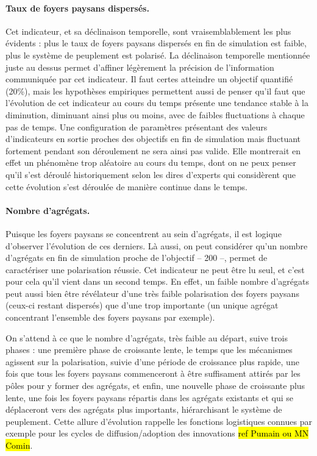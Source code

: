 \paragraph{Taux de foyers paysans dispersés.}

Cet indicateur, et sa déclinaison temporelle, sont vraisemblablement les plus évidents :
plus le taux de foyers paysans dispersés en fin de simulation est faible, plus le système de peuplement est polarisé.
La \og déclinaison temporelle\fg{} mentionnée juste au dessus permet d'affiner légèrement la précision de l'information communiquée par cet indicateur.
Il faut certes atteindre un objectif quantifié (20\%), mais les hypothèses empiriques permettent aussi de penser qu'il faut que l'évolution de cet indicateur au cours du temps présente une tendance stable à la diminution, diminuant ainsi plus ou moins, avec de faibles fluctuations à chaque pas de temps.
Une configuration de paramètres présentant des valeurs d'indicateurs en sortie proches des objectifs en fin de simulation mais fluctuant fortement pendant son déroulement ne sera ainsi pas valide.
Elle montrerait en effet un phénomène trop aléatoire au cours du temps, dont on ne peux penser qu'il s'est déroulé historiquement selon les dires d'experts qui considèrent que cette évolution s'est déroulée de manière continue dans le temps.

\paragraph{Nombre d'agrégats.}

Puisque les foyers paysans se concentrent au sein d'agrégats, il est logique d'observer l'évolution de ces derniers.
Là aussi, on peut considérer qu'un nombre d'agrégats en fin de simulation proche de l'objectif -- 200 --, permet de caractériser une polarisation réussie.
Cet indicateur ne peut être lu seul, et c'est pour cela qu'il vient dans un second temps.
En effet, un faible nombre d'agrégats peut aussi bien être révélateur d'une très faible polarisation des foyers paysans (ceux-ci restant dispersés) que d'une trop importante (un unique agrégat concentrant l'ensemble des foyers paysans par exemple).

On s'attend à ce que le nombre d'agrégats, très faible au départ, suive trois phases :
une première phase de croissante lente, le temps que les mécanismes agissent sur la polarisation, suivie d'une période de croissance plus rapide, une fois que tous les foyers paysans commenceront à être suffisament attirés par les pôles pour y former des agrégats, et enfin, une nouvelle phase de croissante plus lente, une fois les foyers paysans répartis dans les agrégats existants et qui se déplaceront vers des agrégats plus importants, hiérarchisant le système de peuplement.
Cette allure d'évolution rappelle les fonctions logistiques connues par exemple pour les cycles de diffusion/adoption des innovations \hl{ref Pumain ou MN Comin}.

